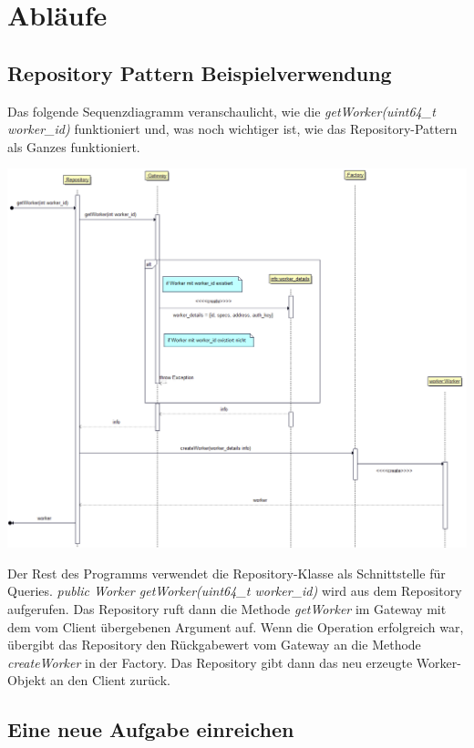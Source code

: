 \documentclass[a4paper,12pt]{article}
\begin{document}
\clearpage

\section{Abläufe}
\subsection{Repository Pattern Beispielverwendung}

Das folgende Sequenzdiagramm veranschaulicht, wie die \textit{getWorker(uint64\_t worker\_id)} funktioniert und, was noch wichtiger ist, wie das Repository-Pattern als Ganzes funktioniert.

\includegraphics[width=\textwidth]{repository_sequence_diagram}

Der Rest des Programms verwendet die Repository-Klasse als Schnittstelle für Queries. \textit{public Worker getWorker(uint64\_t worker\_id)} wird aus dem Repository aufgerufen. Das Repository ruft dann die Methode \textit{getWorker} im Gateway mit dem vom Client übergebenen Argument auf. Wenn die Operation erfolgreich war, übergibt das Repository den Rückgabewert vom Gateway an die Methode \textit{createWorker} in der Factory. Das Repository gibt dann das neu erzeugte Worker-Objekt an den Client zurück.

\clearpage

\subsection{Eine neue Aufgabe einreichen}
\end{document}
